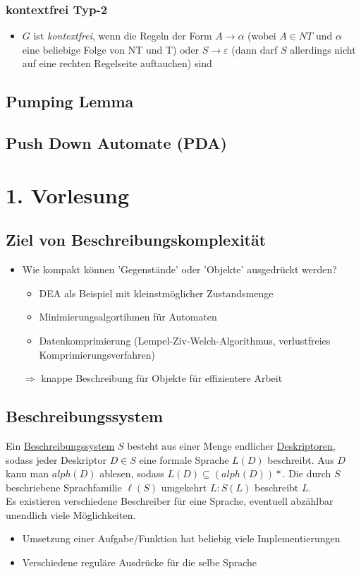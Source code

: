 \documentclass[ngerman]{scrartcl}
\begin{document}
\subsubsection{kontextfrei Typ-2}
\begin{itemize}
\item $G$ ist \textit{kontextfrei}, wenn die Regeln der Form $A \rightarrow \alpha $ (wobei $A \in NT$ und $\alpha$ eine beliebige Folge von NT und T) oder $S \rightarrow \varepsilon$  (dann darf $S$ allerdings nicht auf eine rechten Regelseite auftauchen) sind 
\end{itemize}


\subsection{Pumping Lemma}

\subsection{Push Down Automate (PDA)}

\section{1. Vorlesung}
\subsection{Ziel von Beschreibungskomplexität}
\begin{itemize}
\item Wie kompakt können 'Gegenstände' oder 'Objekte' ausgedrückt werden?

\begin{itemize}
\item DEA als Beispiel mit kleinstmöglicher Zustandsmenge
\item Minimierungsalgortihmen für Automaten
\item Datenkomprimierung (Lempel-Ziv-Welch-Algorithmus, verlustfreies Komprimierungsverfahren)
\end{itemize}
\item[$\Rightarrow$] knappe Beschreibung für Objekte für effizientere Arbeit
\end{itemize}
\subsection{Beschreibungssystem}
Ein \underline{Beschreibungssystem}  $S$ besteht aus einer Menge endlicher \underline{Deskriptoren}, sodass jeder Deskriptor $D\in S$ eine formale Sprache $L(D)$ beschreibt. Aus $D$ kann man $alph(D)$ ablesen, sodass $L(D) \subseteq (alph(D))*$. Die durch $S$ beschriebene Sprachfamilie $\ell(S)$ umgekehrt $L:S(L)$ beschreibt $L$.
\\
Es existieren verschiedene Beschreiber für eine Sprache, eventuell abzählbar unendlich viele Möglichkeiten.
\begin{itemize}
\item Umsetzung einer Aufgabe/Funktion hat beliebig viele Implementierungen
\item Verschiedene reguläre Ausdrücke für die selbe Sprache
\end{itemize}
\end{document}

